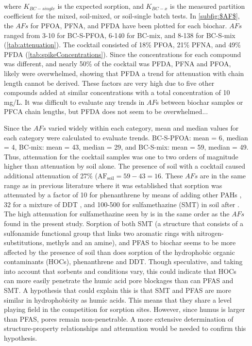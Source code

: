 where $K_{BC-single}$ is the expected sorption, and $K_{BC-x}$ is the measured partition coefficient for the mixed, soil-mixed, or soil-single batch tests. In \cref{subfig:$AF$}, the $AFs$ for PFOA, PFNA, and PFDA have been plotted for each biochar. $AFs$ ranged from 3-10 for BC-S-PFOA, 6-140 for BC-mix, and 8-138 for BC-S-mix (\cref{tab:attenuation}). The cocktail consisted of 18\% PFOA, 21\% PFNA, and 49\% PFDA (\cref{tab:spikeConcentrations}). Since the concentrations for each compound was different, and nearly 50\% of the cocktail was PFDA, PFNA and PFOA, likely were overwhelmed, showing that PFDA  a trend for attenuation with chain length cannot be derived. These factors are very high due to five other compounds added at similar concentrations with a total concentration of 10 mg/L. It was difficult to evaluate any trends in $AF$s between biochar samples or PFCA chain lengths, but PFDA does not seem to be overwhelmed... 

Since the $AFs$ varied widely within each category, mean and median values for each category were calculated to evaluate trends. BC-S-PFOA: mean = 6, median = 4, BC-mix: mean = 43, median = 29, and BC-S-mix: mean = 59, median = 49. Thus, attenuation for the cocktail samples was one to two orders of magnitude higher than attenuation by soil alone. The presence of soil with a cocktail caused additional attenuation of 27\% ($\mathrm{AF_{soil} = 59-43 = 16}$. These $AFs$ are in the same range as in previous literature where it was established that sorption was attenuated by a factor of 10 for phenanthrene by means of adding other PAHs \citep{Cornelissen2006}, 32 for a mixture of DDT \citep{hale2009sorption}, and 100-500 for sulfamethazine (SMT) in soil after \cite{Teixido2013}. The high attenuation for sulfamethazine seen by \cite{Teixido2013} is in the same order as the $AFs$ found in the present study. Sorption of both SMT (a structure  that consists of a sulfonamide functional group that links two aromatic rings with nitrogen-substitutions, methyls and an amine), and PFAS to biochar seems to be more affected by the presence of soil than does sorption of the hydrophobic organic contaminants (HOCs), phenanthrene and DDT. Though speculative, and taking into account that sorbents and conditions vary, this could indicate that HOCs can more easily penetrate the humic acid pore blockages than can PFAS and SMT. A hypothesis that could explain this is that SMT and PFAS are more similar in hydrophobicity as humic acids. This means that they share a level playing field in the competition for sorption sites. However, since humus is larger than PFAS, pores remain non-penetrable. A more extensive determination of structure-property relationships and attenuation would be needed to confirm this hypothesis. 

